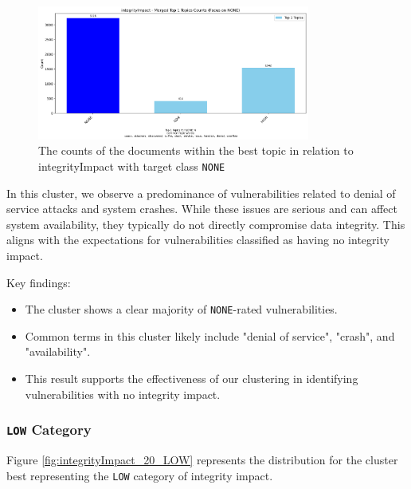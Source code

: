 \documentclass[12pt]{article}
\begin{document}
\begin{figure}[ht]
	\centering
	\includegraphics[width=0.8\textwidth]{figures/integrityImpact/merged_top_k_topics_category_focus_counts_integrityImpact_NONE_k1.png}
	\caption{The counts of the documents within the best topic in relation to integrityImpact with target class \texttt{NONE}}
	\label{fig:integrityImpact_20_NONE}
\end{figure}

In this cluster, we observe a predominance of vulnerabilities related to denial of service attacks
and system crashes. While these issues are serious and can affect system availability, they
typically do not directly compromise data integrity. This aligns with the expectations for
vulnerabilities classified as having no integrity impact.

Key findings:
\begin{itemize}

	\item The cluster shows a clear majority of \texttt{NONE}-rated vulnerabilities.

	\item Common terms in this cluster likely include "denial of service", "crash", and
	      "availability".

	\item This result supports the effectiveness of our clustering in identifying vulnerabilities
	      with no integrity impact.

\end{itemize}

\subsubsection{\texttt{LOW} Category}

Figure \ref{fig:integrityImpact_20_LOW} represents the distribution for the cluster best representing the \texttt{LOW} category of integrity impact.
\end{document}
